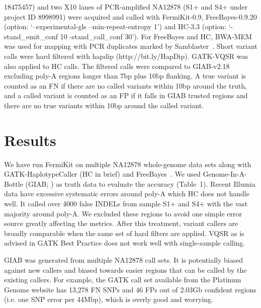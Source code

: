 \documentclass{bioinfo}
\begin{document}
\begin{table}[t]
{18475457) and two X10 lanes of PCR-amplified NA12878 (S1+ and S4+ under project
ID 8998991) were acquired and called with FermiKit-0.9, FreeBayes-0.9.20
(option: `--experimental-gls --min-repeat-entropy 1') and HC-3.3 (option:
`-stand\_emit\_conf 10 -stand\_call\_conf 30'). For FreeBayes and HC, BWA-MEM
was used for mapping with PCR duplicates marked by
Samblaster~\citep{Faust:2014aa}.  Short variant calls were hard filtered with
hapdip (http://bit.ly/HapDip). GATK-VQSR was also applied to HC calls. The
filtered calls were compared to GIAB-v2.18 excluding poly-A regions longer than
7bp plus 10bp flanking. A true variant is counted as an FN if there are no
called variants within 10bp around the truth, and a called variant is counted
as an FP if it falls in GIAB trusted regions and there are no true variants
within 10bp around the called variant.}
\end{table}

\section{Results}
We have run FermiKit on multiple NA12878 whole-genome data sets along with
GATK-HaplotypeCaller (HC in brief) and FreeBayes~\citep{Garrison:2012aa}.
We used Genome-In-A-Bottle (GIAB; \citealt{Zook:2014ab}) as truth data
to evaluate the accuracy (Table~1). Recent Illumia data have excessive
systematic errors around poly-A which HC does not handle well. It called over
4000 false INDELs from sample S1+ and S4+ with the vast majority around poly-A.
We excluded these regions to avoid one simple error source greatly affecting
the metrics. After this treatment, variant callers are broadly comparable when
the same set of hard filters are applied. VQSR as is advised in GATK Best
Practice does not work well with single-sample calling.

GIAB was generated from multiple NA12878 call sets. It is potentially biased
against new callers and biased towards easier regions that can be called by the
existing callers. For example, the GATK call set available from the Platinum
Genome website has 13,278 FN SNPs and 46 FPs out of 2.03Gb confident regions
(i.e. one SNP error per 44Mbp), which is overly good and worrying.
\end{document}
